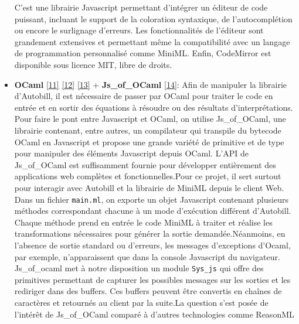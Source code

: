 \documentclass[12pt]{article}
\begin{document}
\begin{itemize}
        C'est une librairie Javascript permettant d'intégrer un éditeur de
        code puissant, incluant le support de la coloration syntaxique, de
        l'autocomplétion ou encore le surlignage d'erreurs. Les
        fonctionnalités de l'éditeur sont grandement extensives et permettant
        même la compatibilité avec un langage de programmation personnalisé
        comme MiniML. Enfin, CodeMirror est disponible sous licence MIT, libre
        de droits.
  \item
        \textbf{OCaml} \protect\hyperlink{ref-Minsky_Ocaml}{{[}11{]}}
        \protect\hyperlink{ref-chailloux}{{[}12{]}}
        \protect\hyperlink{ref-Leroy}{{[}13{]}} + \textbf{Js\_of\_OCaml}
        \protect\hyperlink{ref-js_of_ocaml}{{[}14{]}}: Afin de manipuler la
        librairie d'Autobill, il est nécessaire de passer par OCaml pour
        traiter le code en entrée et en sortir des équations à résoudre ou des
        résultats d'interprétations. Pour faire le pont entre Javascript et
        OCaml, on utilise Js\_of\_OCaml, une librairie contenant, entre
        autres, un compilateur qui transpile du bytecode OCaml en Javascript
        et propose une grande variété de primitive et de type pour manipuler
        des éléments Javascript depuis OCaml. L'API de Js\_of\_OCaml est
        suffisamment fournie pour développer entièrement des applications web
        complètes et fonctionnelles.\newline  Pour ce projet, il sert surtout
        pour interagir avec Autobill et la librairie de MiniML depuis le
        client Web. Dans un fichier \texttt{main.ml}, on exporte un objet
        Javascript contenant plusieurs méthodes correspondant chacune à un
        mode d'exécution différent d'Autobill. Chaque méthode prend en entrée
        le code MiniML à traiter et réalise les transformations nécessaires
        pour générer la sortie demandée.\newline  Néanmoins, en l'absence de
        sortie standard ou d'erreurs, les messages d'exceptions d'Ocaml, par
        exemple, n'apparaissent que dans la console Javascript du navigateur.
        Js\_of\_ocaml met à notre disposition un module \texttt{Sys\_js} qui
        offre des primitives permettant de capturer les possibles messages sur
        les sorties et les rediriger dans des buffers. Ces buffers peuvent
        être convertis en chaînes de caractères et retournés au client par la
        suite.\newline  La question s'est posée de l'intérêt de Js\_of\_OCaml
        comparé à d'autres technologies comme ReasonML

\end{itemize}
\end{document}
